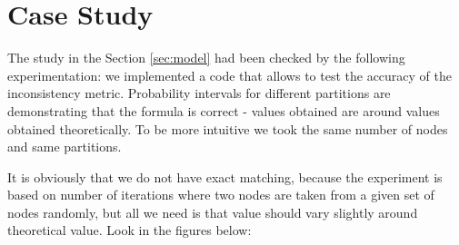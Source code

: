 \documentclass{llncs}
\begin{document}
\section{Case Study}\label{sec:experiments}

The study in the Section \ref{sec:model} had been checked by the following experimentation: 
we implemented a code that allows to test the accuracy of the inconsistency metric. Probability intervals for different partitions are demonstrating that the formula is correct - values obtained are around values obtained theoretically. To be more intuitive we took the same number of nodes and same partitions.

It is obviously that we do not have exact matching, because the experiment is based on number of iterations where two nodes are taken from a given set of nodes randomly, but all we need is that value should vary slightly around theoretical value. Look in the figures below:
%
\end{document}

